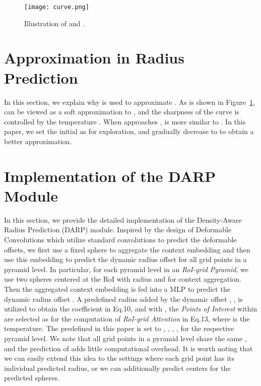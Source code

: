 \documentclass[10pt,twocolumn,letterpaper]{article}
\begin{document}
\clearpage
{\small


}
\clearpage

\appendix

\begin{figure}[!t]
\centering
\texttt{[image: curve.png]}
\caption{Illustration of  and .}
\label{fig_curve}
\end{figure}

\section{Approximation in Radius Prediction}
In this section, we explain why  is used to approximate . As is shown in Figure~\ref{fig_curve},  can be viewed as a soft approximation to , and the sharpness of the curve  is controlled by the temperature . When  approaches ,  is more similar to . In this paper, we set the initial  as  for exploration, and gradually decrease  to  to obtain a better approximation.

\section{Implementation of the DARP Module}
In this section, we provide the detailed implementation of the Density-Aware Radius Prediction (DARP) module. Inspired by the design of Deformable Convolutions which utilize standard convolutions to predict the deformable offsets, we first use a fixed sphere to aggregate the context embedding and then use this embedding to predict the dynamic radius offset for all grid points in a pyramid level. In particular, for each pyramid level in an \textit{RoI-grid Pyramid}, we use two spheres centered at the RoI with radius  and  for context aggregation. Then the aggregated context embedding is fed into a MLP to predict the dynamic radius offset . A predefined radius  added by the dynamic offset , \ie , is utilized to obtain the coefficient  in Eq.10, and with , the \textit{Points of Interest} within  are selected as  for the computation of \textit{RoI-grid Attention} in Eq.13, where  is the temperature. The predefined  in this paper is set to , , , ,  for the respective pyramid level. We note that all grid points in a pyramid level share the same , and the prediction of  adds little computational overhead. It is worth noting that we can easily extend this idea to the settings where each grid point has its individual predicted radius, or we can additionally predict centers for the predicted spheres. 
\end{document}
